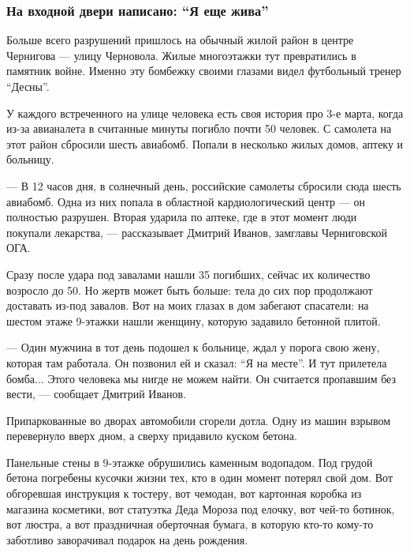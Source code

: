  
 
 
 
 

\subsubsection{На входной двери написано: \enquote{Я еще жива}}

Больше всего разрушений пришлось на обычный жилой район в центре Чернигова —
улицу Черновола. Жилые многоэтажки тут превратились в памятник войне. Именно
эту бомбежку своими глазами видел футбольный тренер \enquote{Десны}.


У каждого встреченного на улице человека есть своя история про 3-е марта, когда
из-за авианалета в считанные минуты погибло почти 50 человек. С самолета на
этот район сбросили шесть авиабомб. Попали в несколько жилых домов, аптеку и
больницу. 

— В 12 часов дня, в солнечный день, российские самолеты сбросили сюда шесть
авиабомб. Одна из них попала в областной кардиологический центр — он полностью
разрушен. Вторая ударила по аптеке, где в этот момент люди покупали лекарства,
— рассказывает Дмитрий Иванов, замглавы Черниговской ОГА.

Сразу после удара под завалами нашли 35 погибших, сейчас их количество возросло
до 50. Но жертв может быть больше: тела до сих пор продолжают доставать из-под
завалов. Вот на моих глазах в дом забегают спасатели: на шестом этаже 9-этажки
нашли женщину, которую задавило бетонной плитой. 

— Один мужчина в тот день подошел к больнице, ждал у порога свою жену, которая
там работала. Он позвонил ей и сказал: \enquote{Я на месте}. И тут прилетела бомба...
Этого человека мы нигде не можем найти. Он считается пропавшим без вести, —
сообщает Дмитрий Иванов. 

Припаркованные во дворах автомобили сгорели дотла. Одну из машин взрывом
перевернуло вверх дном, а сверху придавило куском бетона. 

Панельные стены в 9-этажке обрушились каменным водопадом. Под грудой бетона
погребены кусочки жизни тех, кто в один момент потерял свой дом. Вот обгоревшая
инструкция к тостеру, вот чемодан, вот картонная коробка из магазина косметики,
вот статуэтка Деда Мороза под елочку, вот чей-то ботинок, вот люстра, а вот
праздничная оберточная бумага, в которую кто-то кому-то заботливо заворачивал
подарок на день рождения.

